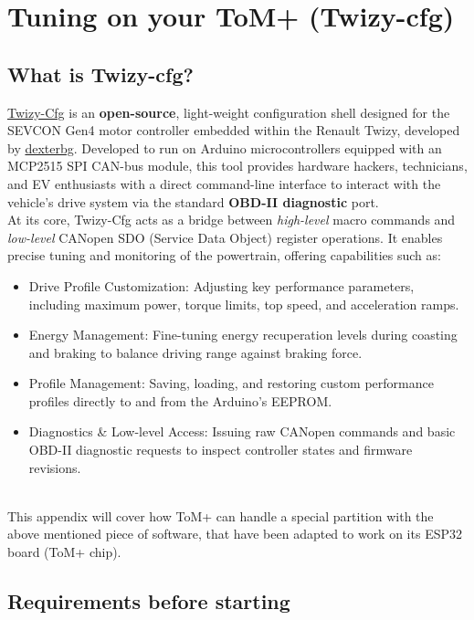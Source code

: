 \appendix
\chapter{Tuning on your ToM+ (Twizy-cfg)}
\label{apx:tuning}

\section{What is Twizy-cfg?}

\href{http://github.com/dexterbg/Twizy-Cfg}{Twizy-Cfg} is an \textbf{open-source}, light-weight configuration shell designed for the SEVCON
Gen4 motor controller embedded within the Renault Twizy, developed by \href{https://github.com/dexterbg}{dexterbg}. 
Developed to run on Arduino microcontrollers equipped with an MCP2515 SPI CAN-bus module,
this tool provides hardware hackers, technicians, and EV enthusiasts with a direct 
command-line interface to interact with the vehicle's drive system via the standard 
\textbf{OBD-II diagnostic} port.\\

At its core, Twizy-Cfg acts as a bridge between \textit{high-level} macro commands and \textit{low-level}
CANopen SDO (Service Data Object) register operations. It enables precise tuning and
monitoring of the powertrain, offering capabilities such as:\\

\begin{itemize}
    \item Drive Profile Customization: Adjusting key performance parameters, including maximum power, torque limits, top speed, and acceleration ramps.
    \item Energy Management: Fine-tuning energy recuperation levels during coasting and braking to balance driving range against braking force.
    \item Profile Management: Saving, loading, and restoring custom performance profiles directly to and from the Arduino's EEPROM.
    \item Diagnostics \& Low-level Access: Issuing raw CANopen commands and basic OBD-II diagnostic requests to inspect controller states and firmware revisions.  
\end{itemize}
\  \\
This appendix will cover how ToM+ can handle a special partition with the above mentioned
piece of software, that have been adapted to work on its ESP32 board (ToM+ chip).


\section{Requirements before starting}

